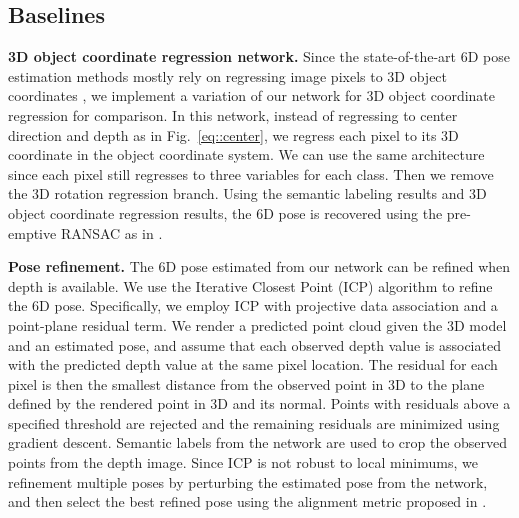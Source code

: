 \documentclass[conference]{IEEEtran}
\begin{document}
\subsection{Baselines}

\textbf{3D object coordinate regression network.} Since the state-of-the-art 6D pose estimation methods mostly rely on regressing image pixels to 3D object coordinates \cite{brachmann2014learning,brachmann2016uncertainty,michel2016global}, we implement a variation of our network for 3D object coordinate regression for comparison. In this network, instead of regressing to center direction and depth as in Fig.~\ref{eq::center}, we regress each pixel to its 3D coordinate in the object coordinate system. We can use the same architecture since each pixel still regresses to three variables for each class. Then we remove the 3D rotation regression branch. Using the semantic labeling results and 3D object coordinate regression results, the 6D pose is recovered using the pre-emptive RANSAC as in \cite{brachmann2016uncertainty}.

\textbf{Pose refinement.} The 6D pose estimated from our network can be refined when depth is available. We use the Iterative Closest Point (ICP) algorithm to refine the 6D pose. Specifically, we employ ICP with projective data association and a point-plane residual term. We render a predicted point cloud given the 3D model and an estimated pose, and assume that each observed depth value is associated with the predicted depth value at the same pixel location. The residual for each pixel is then the smallest distance from the observed point in 3D to the plane defined by the rendered point in 3D and its normal. Points with residuals above a specified threshold are rejected and the remaining residuals are minimized using gradient descent. Semantic labels from the network are used to crop the observed points from the depth image. Since ICP is not robust to local minimums, we refinement multiple poses by perturbing the estimated pose from the network, and then select the best refined pose using the alignment metric proposed in \cite{wong2017segicp}.

\end{document}
